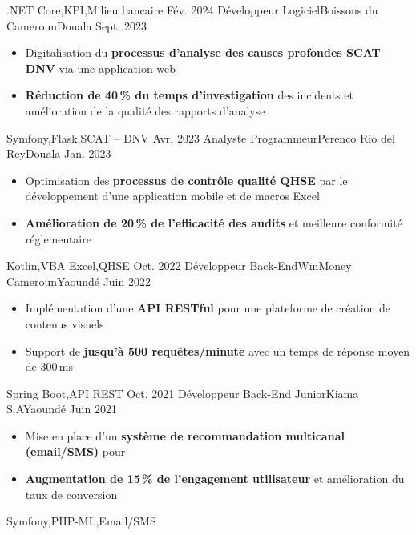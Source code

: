 \begin{experiences}
                    {.NET Core,KPI,Milieu bancaire}
  \emptySeparator
  \experience
    {Fév. 2024}   {Développeur Logiciel}{Boissons du Cameroun}{Douala}
    {Sept. 2023} {
                      \begin{itemize}
                        \item Digitalisation du \textbf{processus d'analyse des causes profondes SCAT -- DNV} via une application web
                        \item \textbf{Réduction de 40\,\% du temps d'investigation} des incidents et amélioration de la qualité des rapports d'analyse
                      \end{itemize}
                    }
                    {Symfony,Flask,SCAT -- DNV}
  \emptySeparator
  \experience
    {Avr. 2023}   {Analyste Programmeur}{Perenco Rio del Rey}{Douala}
    {Jan. 2023} {
                      \begin{itemize}
                        \item Optimisation des \textbf{processus de contrôle qualité QHSE} par le développement d'une application mobile et de macros Excel
                        \item \textbf{Amélioration de 20\,\% de l'efficacité des audits} et meilleure conformité réglementaire
                      \end{itemize}
                    }
                    {Kotlin,VBA Excel,QHSE}
  \emptySeparator
  \experience
    {Oct. 2022}   {Développeur Back-End}{WinMoney Cameroun}{Yaoundé}
    {Juin 2022} {
                      \begin{itemize}
                        \item Implémentation d'une \textbf{API RESTful} pour une plateforme de création de contenus visuels
                        \item Support de \textbf{jusqu'à 500 requêtes/minute} avec un temps de réponse moyen de 300\,ms
                      \end{itemize}
                    }
                    {Spring Boot,API REST}
  \emptySeparator
  \experience
    {Oct. 2021}   {Développeur Back-End Junior}{Kiama S.A}{Yaoundé}
    {Juin 2021} {
                      \begin{itemize}
                        \item Mise en place d'un \textbf{système de recommandation multicanal (email/SMS)} pour 
                        \item \textbf{Augmentation de 15\,\% de l'engagement utilisateur} et amélioration du taux de conversion
                      \end{itemize}
                    }
                    {Symfony,PHP-ML,Email/SMS}
\end{experiences}
